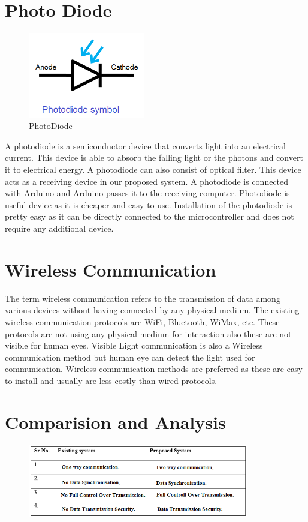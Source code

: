 \documentclass{ijcaArticle}
\begin{document}
\section{Photo Diode}
\label{sec:additional_faci}

\begin{figure}[h]
\centering
\includegraphics[width=2in]{PhotoDiode.png}
\caption{PhotoDiode}
\label{fig:Photo Diode}
\end{figure}
A photodiode is a semiconductor device that converts light into an electrical current. This device is able to absorb the falling light or the photons and convert it to electrical energy. A photodiode can also consist of optical filter. This device acts as a receiving device in our proposed system. A photodiode is connected with Arduino and Arduino passes it to the receiving computer. Photodiode is  useful device as it is cheaper and easy to use. Installation of the photodiode is pretty easy  as it can be directly connected to the microcontroller and does not require any additional device.

\section{Wireless Communication}
\label{sec:additional_faci}
The term wireless communication refers to the transmission of data among various devices without having connected by any physical medium. The existing wireless communication protocols are WiFi, Bluetooth, WiMax, etc. These protocols are not using any physical medium for interaction also these are not visible for human eyes. Visible Light communication is also a Wireless communication method but human eye can detect the light used for communication. Wireless communication methods are preferred as these are easy to install and usually are less costly than wired protocols.

\section{Comparision and Analysis}
\label{sec:additional_faci}

\begin{figure}[h]
\centering
\includegraphics[width=3.8in]{comp.png}
\end{figure}
\end{document}

